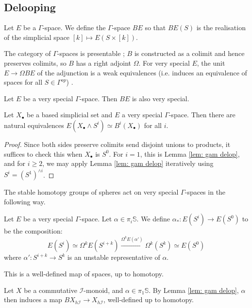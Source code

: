 \documentclass{TPmod}
\def\bS{\mathbb{S}}
\newcommand{\cI}{\mathcal{I}}
\numberwithin{equation}{section}
\begin{document}
\subsection{Delooping}\label{sec: de loop}
    \begin{defn}
        Let $E$ be a $\Gamma$-space. We define the $\Gamma$-space $BE$ so that $BE(S)$ is the realisation of the simplicial space $[k] \mapsto E(S \times [k])$.
    \end{defn}
    The category of $\Gamma$-spaces is presentable \cite[Appendix A]{Schwede:Gamma}; $B$ is constructed as a colimit and hence preserves colimits, so $B$ has a right adjoint $\Omega$. For very special $E$, the unit $E \to \Omega B E$ of the adjunction is a weak equivalences (i.e. induces an equivalence of spaces for all $S \in \Gamma^{op}$) \cite{Segal}. 
    \begin{lem}
        Let $E$ be a very special $\Gamma$-space. Then $BE$ is also very special.
    \end{lem}
    \begin{lem}
        Let $X_\bullet$ be a based simplicial set and $E$ a very special $\Gamma$-space. Then there are natural equivalences $E(X_\bullet \wedge S^i) \simeq B^i(X_\bullet)$ for all $i$.
    \end{lem}
    \begin{proof}
        Since both sides preserve colimits send disjoint unions to products, it suffices to check this when $X_\bullet$ is $S^0$. For $i=1$, this is Lemma \ref{lem: gam delop}, and for $i \geq 2$, we may apply Lemma \ref{lem: gam delop} iteratively using $S^i = (S^1)^{\wedge i}$.
    \end{proof}
    The stable homotopy groups of spheres act on very special $\Gamma$-spaces in the following way.
    \begin{defn}\label{def: stab stem act gam}
        Let $E$ be a very special $\Gamma$-space. Let $\alpha \in \pi_i\bS$. We define $\alpha_*: E(S^i) \to E(S^0)$ to be the composition:
        \begin{equation}\label{ewojfwrpjgerj}
            E(S^i) \simeq \Omega^k E(S^{i+k}) \xrightarrow{\Omega^k E(\alpha')} \Omega^k(S^k) \simeq E(S^0)
        \end{equation}
        where $\alpha': S^{i+k} \to S^k$ is an unstable representative of $\alpha$.

        This is a well-defined map of spaces, up to homotopy.
    \end{defn}
    \begin{rmk}\label{rmk: eta act i spac}
        Let $X$ be a commutative $\cI$-monoid, and $\alpha \in \pi_1\bS$. By Lemma \ref{lem: gam delop}, $\alpha$ then induces a map $BX_{h\cI} \to X_{h\cI}$, well-defined up to homotopy.
    \end{rmk}
    
\end{document}

